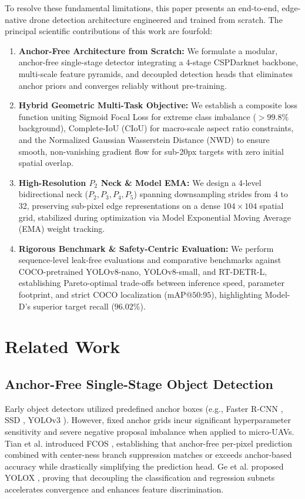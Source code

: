 \documentclass[conference]{IEEEtran}
\begin{document}
To resolve these fundamental limitations, this paper presents an end-to-end, edge-native drone detection architecture engineered and trained from scratch. The principal scientific contributions of this work are fourfold:
\begin{enumerate}
    \item \textbf{Anchor-Free Architecture from Scratch:} We formulate a modular, anchor-free single-stage detector integrating a 4-stage CSPDarknet backbone, multi-scale feature pyramids, and decoupled detection heads that eliminates anchor priors and converges reliably without pre-training.
    \item \textbf{Hybrid Geometric Multi-Task Objective:} We establish a composite loss function uniting Sigmoid Focal Loss for extreme class imbalance ($>99.8\%$ background), Complete-IoU (CIoU) for macro-scale aspect ratio constraints, and the Normalized Gaussian Wasserstein Distance (NWD) to ensure smooth, non-vanishing gradient flow for sub-20px targets with zero initial spatial overlap.
    \item \textbf{High-Resolution $P_2$ Neck \& Model EMA:} We design a 4-level bidirectional neck ($P_2, P_3, P_4, P_5$) spanning downsampling strides from 4 to 32, preserving sub-pixel edge representations on a dense $104 \times 104$ spatial grid, stabilized during optimization via Model Exponential Moving Average (EMA) weight tracking.
    \item \textbf{Rigorous Benchmark \& Safety-Centric Evaluation:} We perform sequence-level leak-free evaluations and comparative benchmarks against COCO-pretrained YOLOv8-nano, YOLOv8-small, and RT-DETR-L, establishing Pareto-optimal trade-offs between inference speed, parameter footprint, and strict COCO localization ($\text{mAP@50:95}$), highlighting Model-D's superior target recall ($96.02\%$).
\end{enumerate}

\section{Related Work}

\subsection{Anchor-Free Single-Stage Object Detection}
Early object detectors utilized predefined anchor boxes (e.g., Faster R-CNN \cite{ren2015faster}, SSD \cite{liu2016ssd}, YOLOv3 \cite{redmon2018yolov3}). However, fixed anchor grids incur significant hyperparameter sensitivity and severe negative proposal imbalance when applied to micro-UAVs. Tian et al. introduced FCOS \cite{tian2019fcos}, establishing that anchor-free per-pixel prediction combined with center-ness branch suppression matches or exceeds anchor-based accuracy while drastically simplifying the prediction head. Ge et al. proposed YOLOX \cite{ge2021yolox}, proving that decoupling the classification and regression subnets accelerates convergence and enhances feature discrimination.
\end{document}
